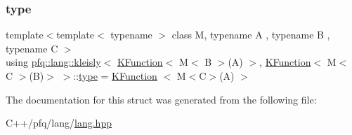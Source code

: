 \subsubsection{\texorpdfstring{type}{type}}
{\footnotesize\ttfamily template$<$template$<$ typename $>$ class M, typename A , typename B , typename C $>$ \\
using \hyperlink{structpfq_1_1lang_1_1kleisly}{pfq\+::lang\+::kleisly}$<$ \hyperlink{structpfq_1_1lang_1_1KFunction}{K\+Function}$<$ M$<$ B $>$(A) $>$, \hyperlink{structpfq_1_1lang_1_1KFunction}{K\+Function}$<$ M$<$ C $>$(B)$>$ $>$\+::\hyperlink{structpfq_1_1lang_1_1kleisly_3_01KFunction_3_01M_3_01B_01_4_07A_08_01_4_00_01KFunction_3_01M_3_01C_01_4_07B_08_4_01_4_a733eac3b86940e76816571e91cf26ea3}{type} =  \hyperlink{structpfq_1_1lang_1_1KFunction}{K\+Function} $<$ M$<$C$>$(A) $>$}



The documentation for this struct was generated from the following file\+:\begin{DoxyCompactItemize}
\item 
C++/pfq/lang/\hyperlink{lang_8hpp}{lang.\+hpp}\end{DoxyCompactItemize}
